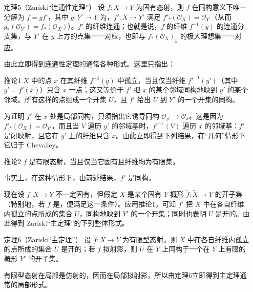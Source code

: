 \begin{statement}{定理5（Zariski“连通性定理”）}
设 $f:X\to Y$ 为固有态射，则 $f$ 在同构意义下唯一分解为 $f=gf'$，其中 $g:Y'\to Y$ 为，$f':X\to Y'$ 满足 $f'_*(\mathcal O_X)=\mathcal O_{Y'}$（从而 $g_*(\mathcal O_{Y'})=f_*(\mathcal O_X)$）。$f'$ 的纤维连通；也就是说，$f$ 的纤维 $f^{-1}(y)$ 的连通分支集，与 $Y'$ 在 $y$ 上方的点集一一对应，也即与 $f_*(\mathcal O_X)_y$ 的极大理想集一一对应。
\end{statement}

由此立即得到连通性定理的通常各种形式。这里只指出：
\begin{statement}{推论1}
$X$ 中的点 $x$ 在其纤维 $f^{-1}(y)$ 中孤立，当且仅当纤维 $f'^{-1}(y')$（其中 $y'=f'(x)$）只含 $x$ 一点；这又等价于 $f'$ 把 $x$ 的某个邻域同构地映到 $y'$ 的某个邻域。所有这样的点组成一个开集 $U$，且 $f'$ 给出 $U$ 到 $Y'$ 的一个开集的同构。
\end{statement}
为证明 $f'$ 在 $x$ 处是局部同构，只须指出它诱导同构 $\mathcal O_{y'}\to\mathcal O_x$。这是因为 $f'_*(\mathcal O_X)=\mathcal O_{Y'}$，而且当 $V$ 遍历 $y'$ 的邻域基时，$f'^{-1}(V)$ 遍历 $x$ 的邻域基：$f'$ 是闭映射，且它在 $y'$ 上的纤维只含 $x$。由此立即得到下列结果，在“几何”情形下它归于 Chevalley。
\begin{statement}{推论2}
$f$ 是有限态射，当且仅当它固有且纤维均为有限集。
\end{statement}
事实上，在这种情形下，由前述结果，$f'$ 是同构。

现在设 $f:X\to Y$ 不一定固有，但假定 $X$ 是某个固有 $Y$-概形 $\widetilde f:\widetilde X\to Y$ 的开子集（特别地，若 $f$ 是，便满足这一条件）。应用推论1，可知 $\widetilde f'$ 把 $X$ 中在各自纤维内孤立的点所成的集合 $U$，同构地映到 $Y'$ 的一个开集；同时也表明 $U$ 是开的。由此得到 Zariski“主定理”的下列整体形式。
\begin{statement}{定理6（Zariski“主定理”）}
设 $f:X\to Y$ 为有限型态射。则 $X$ 中在各自纤维内孤立的点所成的集合 $U$ 是开的；若 $f$ 拟射影，则 $U$ 在 $Y$ 上同构于一个在 $Y$ 上有限的概形 $Y'$ 的开子集。
\end{statement}
有限型态射在局部是仿射的，因而在局部拟射影，所以由定理6立即得到主定理通常的局部形式。

